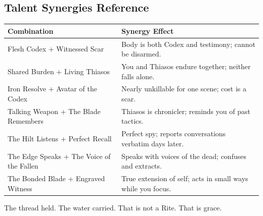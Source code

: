 \subsection{Talent Synergies Reference}

\begin{longtable}{p{} p{}}
\hline
\textbf{Combination} & \textbf{Synergy Effect} \\
\hline
Flesh Codex + Witnessed Scar & Body is both Codex and testimony; cannot be disarmed. \\
Shared Burden + Living Thiasos & You and Thiasos endure together; neither falls alone. \\
Iron Resolve + Avatar of the Codex & Nearly unkillable for one scene; cost is a scar. \\
Talking Weapon + The Blade Remembers & Thiasos is chronicler; reminds you of past tactics. \\
The Hilt Listens + Perfect Recall & Perfect spy; reports conversations verbatim days later. \\
The Edge Speaks + The Voice of the Fallen & Speaks with voices of the dead; confuses and extracts. \\
The Bonded Blade + Engraved Witness & True extension of self; acts in small ways while you focus. \\
\hline
\end{longtable}

The thread held. The water carried. That is not a Rite. That is grace.
